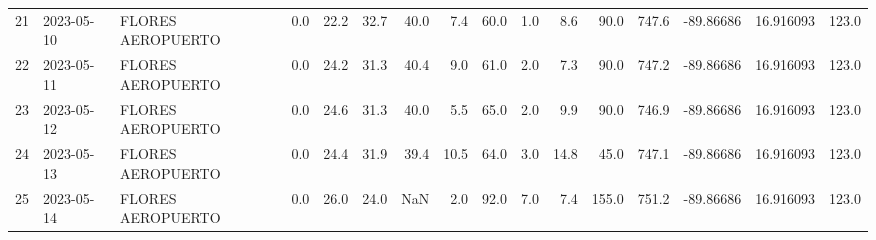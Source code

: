 \documentclass[12pt]{article}
\begin{document}
\begin{center}
\begin{tabular}{lllrrrrrrrrrrrrr}
21  & 2023-05-10 &  FLORES AEROPUERTO &     0.0 &  22.2 &   32.7 &  40.0 &      7.4 &     60.0 &  1.0 &         8.6 &        90.0 &      747.6 & -89.86686 &  16.916093 &    123.0 \\
22  & 2023-05-11 &  FLORES AEROPUERTO &     0.0 &  24.2 &   31.3 &  40.4 &      9.0 &     61.0 &  2.0 &         7.3 &        90.0 &      747.2 & -89.86686 &  16.916093 &    123.0 \\
23  & 2023-05-12 &  FLORES AEROPUERTO &     0.0 &  24.6 &   31.3 &  40.0 &      5.5 &     65.0 &  2.0 &         9.9 &        90.0 &      746.9 & -89.86686 &  16.916093 &    123.0 \\
24  & 2023-05-13 &  FLORES AEROPUERTO &     0.0 &  24.4 &   31.9 &  39.4 &     10.5 &     64.0 &  3.0 &        14.8 &        45.0 &      747.1 & -89.86686 &  16.916093 &    123.0 \\
25  & 2023-05-14 &  FLORES AEROPUERTO &     0.0 &  26.0 &   24.0 &   NaN &      2.0 &     92.0 &  7.0 &         7.4 &       155.0 &      751.2 & -89.86686 &  16.916093 &    123.0 \\
\bottomrule
\end{tabular}

        
        \end{center}
        
\end{document}
